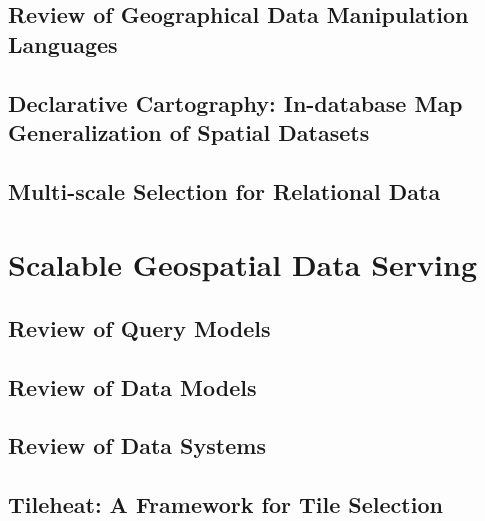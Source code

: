 \documentclass[11pt, oneside]{report}   	%
\begin{document}
\chapter{Review of Geographical Data Manipulation Languages}
\chapter{Declarative Cartography: In-database Map Generalization of Spatial Datasets}
\chapter{Multi-scale Selection for Relational Data}

\part{Scalable Geospatial Data Serving}
\chapter{Review of Query Models}
\chapter{Review of Data Models}
\chapter{Review of Data Systems}

\chapter{Tileheat: A Framework for Tile Selection}
\end{document}
